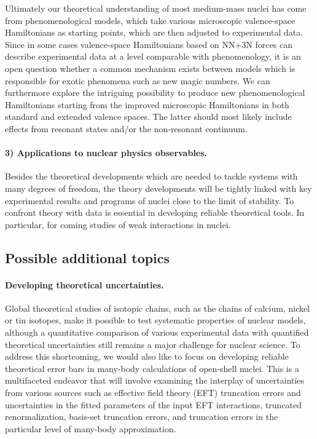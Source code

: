 \documentclass[%
twoside,                 %
final,                   %
10pt]{article}
\begin{document}
Ultimately our theoretical understanding of most medium-mass nuclei has come 
from phenomenological models, which take various microscopic valence-space 
Hamiltonians as starting points, which are then adjusted to experimental data.  Since in some cases valence-space Hamiltonians based on NN+3N forces can describe experimental 
data at a level comparable with phenomenology, it is an open question whether a 
common mechanism exists between models which is responsible for exotic 
phenomena such as new magic numbers.  We can furthermore explore the 
intriguing possibility to produce new phenomenological Hamiltonians starting from 
the improved microscopic Hamiltonians in both standard and 
extended valence spaces. The latter should most likely include effects from resonant states and/or the non-resonant continuum.




\paragraph{3) Applications to nuclear physics observables.}

Besides the theoretical developments which are needed to tackle systems with many degrees of freedom, the theory developments  will be tightly linked with key experimental results and programs of nuclei close to the limit of stability. 
To confront theory with data is essential in developing reliable theoretical tools. In particular, for coming studies 
of weak interactions in nuclei.



\subsection*{Possible additional topics}

\paragraph{Developing theoretical uncertainties.}
Global theoretical
studies of isotopic chains, such as the chains of calcium, nickel or
tin isotopes, make it possible to test systematic properties of
nuclear models, although a quantitative
comparison of various experimental data with quantified theoretical
uncertainties still remains a major challenge for nuclear science. To
address this shortcoming, we would also like to 
focus on developing reliable theoretical error bars in many-body
calculations of open-shell nuclei. This is a multifaceted endeavor that will involve examining the interplay of uncertainties from various sources
such as effective field theory (EFT) truncation errors and uncertainties in the
fitted parameters of the input EFT interactions, truncated renormalization, basis-set
truncation errors, and truncation errors in the particular level of
many-body approximation.
\end{document}
